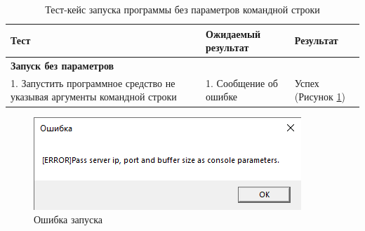 \begin{table}[htb]
	\caption{Тест-кейс запуска программы без параметров командной строки}
	\label{table:testing:func:test7}
	\centering
	  \begin{tabular}{| >{\raggedright}m{} 
					  | >{\raggedright}m{} 
					  | >{\raggedright\arraybackslash}m{}|}
	  \hline Тест & Ожидаемый результат  & Результат \\
	  \hline \textbf{Запуск без параметров} \\ 1. Запустить программное средство не указывая аргументы командной строки & 1. Сообщение об ошибке & Успех (Рисунок \ref*{sec:testing:func:runerr})\\
	  \hline
	  \end{tabular}
\end{table}

\begin{figure}[htb]
	\centering
	  \includegraphics[scale=1]{attachments/runerr.png}  
	  \caption{ Ошибка запуска }
	  \label{sec:testing:func:runerr}
\end{figure}

